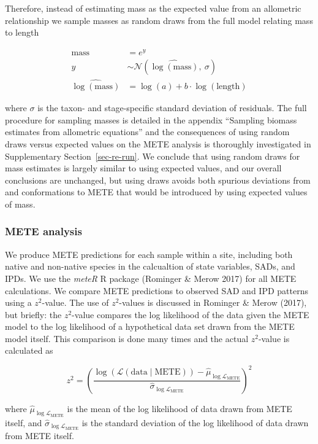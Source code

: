 \documentclass[
  letterpaper,
  DIV=11,
  numbers=noendperiod]{scrartcl}
\newcommand{\ssec}[1]{Supplementary Section~\ref{#1}}
\begin{document}
Therefore, instead of estimating mass as the expected value from an
allometric relationship we sample masses as random draws from the full
model relating mass to length

\[
\begin{aligned}
\text{mass} & = e^{y} \\
y &\sim \mathscr{N}(\widehat{\log(\text{mass})}, ~\sigma) \\
\widehat{\log(\text{mass})} &= \log(a) + b \cdot \log(\text{length})
\end{aligned}
\]

where \(\sigma\) is the taxon- and stage-specific standard deviation of
residuals. The full procedure for sampling masses is detailed in the
appendix ``Sampling biomass estimates from allometric equations'' and
the consequences of using random draws versus expected values on the
METE analysis is thoroughly investigated in \ssec{sec-re-run}. We
conclude that using random draws for mass estimates is largely similar
to using expected values, and our overall conclusions are unchanged, but
using draws avoids both spurious deviations from and conformations to
METE that would be introduced by using expected values of mass.

\subsubsection{METE analysis}\label{mete-analysis}

We produce METE predictions for each sample within a site, including
both native and non-native species in the calcualtion of state
variables, SADs, and IPDs. We use the \emph{meteR} R package (Rominger
\& Merow 2017) for all METE calculations. We compare METE predictions to
observed SAD and IPD patterns using a \(z^2\)-value. The use of
\(z^2\)-values is discussed in Rominger \& Merow (2017), but briefly:
the \(z^2\)-value compares the log likelihood of the data given the METE
model to the log likelihood of a hypothetical data set drawn from the
METE model itself. This comparison is done many times and the actual
\(z^2\)-value is calculated as

\[
z^2 = \left(\frac{\log(\mathscr{L}(\text{data} \mid \text{METE})) - \hat{\mu}_{\log\mathscr{L}_\text{METE}}}{\hat{\sigma}_{\log\mathscr{L}_\text{METE}}}\right)^2
\]

where \(\hat{\mu}_{\log\mathscr{L}_\text{METE}}\) is the mean of the log
likelihood of data drawn from METE itself, and
\(\hat{\sigma}_{\log\mathscr{L}_\text{METE}}\) is the standard deviation
of the log likelihood of data drawn from METE itself.
\end{document}
